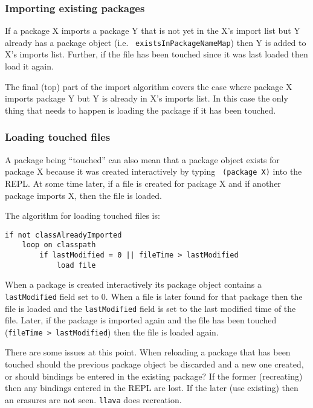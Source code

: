 \documentclass{acm-final/sig-alternate-modified}
\begin{document}
\subsubsection{Importing existing packages}

If a package X imports a package Y that is not yet in
the X's import list but Y already has a package object (i.e. {\tt
existsInPackageNameMap}) then Y is added to X's imports list.  Further,
if the file has been touched since it was last loaded then load it
again.

The final (top) part of the import algorithm covers the case where package X
imports package Y but Y is already in X's imports list.  In this case
the only thing that needs to happen is loading the package if it has
been touched.

\subsubsection{Loading touched files}

A package being ``touched'' can also mean that a package object exists
for package X because it was created interactively by typing {\tt
(package X)} into the REPL.  At some time later, if a file is created
for package X and if another package imports X, then the file is
loaded.

The algorithm for loading touched files is:

\small
\begin{verbatim}
if not classAlreadyImported
    loop on classpath
        if lastModified = 0 || fileTime > lastModified
            load file
\end{verbatim}
\normalsize

When a package is created interactively its package object contains a
{\tt lastModified} field set to 0.  When a file is later found for
that package then the file is loaded and the {\tt lastModified} field
is set to the last modified time of the file.  Later, if the package
is imported again and the file has been touched ({\tt fileTime >
lastModified}) then the file is loaded again.

There are some issues at this point.  When reloading a package that
has been touched should the previous package object be discarded and a
new one created, or should bindings be entered in the existing
package?  If the former (recreating) then any bindings entered in the
REPL are lost.  If the later (use existing) then an erasures are not
seen.  {\tt llava} does recreation.
\end{document}
